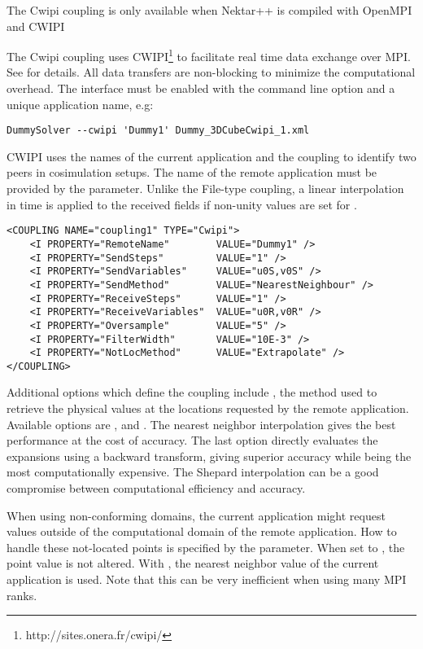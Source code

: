 \begin{notebox}
    The Cwipi coupling is only available when Nektar++ is compiled with OpenMPI and CWIPI
\end{notebox}
The Cwipi coupling uses CWIPI\footnote{http://sites.onera.fr/cwipi/} to facilitate real time data exchange over MPI.
See \cite{La18} for details.
All data transfers are non-blocking to minimize the computational overhead.
The interface must be enabled with the command line option  and a unique application name, e.g:\begin{lstlisting}[style=BashInputStyle] 
DummySolver --cwipi 'Dummy1' Dummy_3DCubeCwipi_1.xml
\end{lstlisting}
CWIPI uses the names of the current application and the coupling to identify two peers in cosimulation setups.
The name of the remote application must be provided by the  parameter.
Unlike the File-type coupling, a linear interpolation in time is applied to the received fields if non-unity values are set for .
\begin{lstlisting}[style=XMLStyle] 
<COUPLING NAME="coupling1" TYPE="Cwipi">
    <I PROPERTY="RemoteName"        VALUE="Dummy1" />
    <I PROPERTY="SendSteps"         VALUE="1" />
    <I PROPERTY="SendVariables"     VALUE="u0S,v0S" />
    <I PROPERTY="SendMethod"        VALUE="NearestNeighbour" />
    <I PROPERTY="ReceiveSteps"      VALUE="1" />
    <I PROPERTY="ReceiveVariables"  VALUE="u0R,v0R" />
    <I PROPERTY="Oversample"        VALUE="5" />
    <I PROPERTY="FilterWidth"       VALUE="10E-3" />
    <I PROPERTY="NotLocMethod"      VALUE="Extrapolate" />
</COUPLING>
\end{lstlisting}

Additional options which define the coupling include , the method used to retrieve the physical values at the locations requested by the remote application.
Available options are ,  and . 
The nearest neighbor interpolation gives the best performance at the cost of accuracy. 
The last option directly evaluates the expansions using a backward transform, giving superior accuracy while being the most computationally expensive. 
The Shepard interpolation can be a good compromise between computational efficiency and accuracy.

When using non-conforming domains, the current application might request values outside of the computational domain of the remote application.
How to handle these not-located points is specified by the  parameter.
When set to , the point value is not altered.
With , the nearest neighbor value of the current application is used.
Note that this can be very inefficient when using many MPI ranks.


